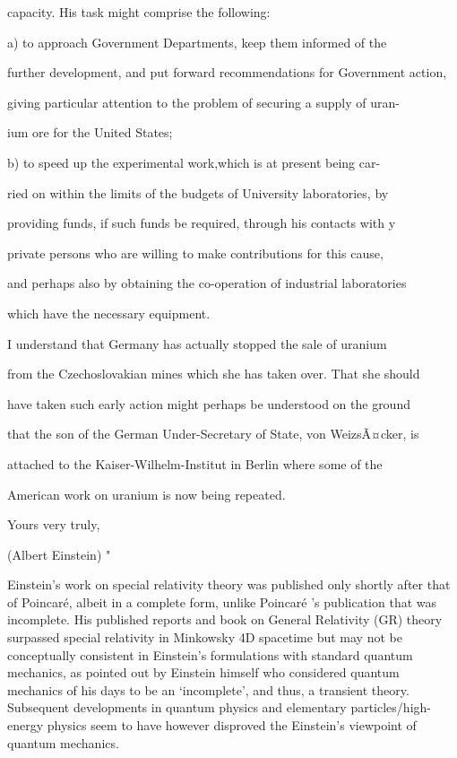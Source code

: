 \documentclass[12pt]{article}
\begin{document}
capacity. His task might comprise the following:

      a) to approach Government Departments, keep them informed of the

further development, and put forward recommendations for Government action,

giving particular attention to the problem of securing a supply of uran-

ium ore for the United States;

      b) to speed up the experimental work,which is at present being car-

ried on within the limits of the budgets of University laboratories, by

providing funds, if such funds be required, through his contacts with y

private persons who are willing to make contributions for this cause,

and perhaps also by obtaining the co-operation of industrial laboratories

which have the necessary equipment.

      I understand that Germany has actually stopped the sale of uranium

from the Czechoslovakian mines which she has taken over. That she should

have taken such early action might perhaps be understood on the ground

that the son of the German Under-Secretary of State, von WeizsÃ¤cker, is

attached to the Kaiser-Wilhelm-Institut in Berlin where some of the

American work on uranium is now being repeated.

                                            Yours very truly,
                                             
                                            (Albert Einstein) "
 

Einstein's work on special relativity theory was published only shortly after that of Poincar\'e, albeit in a complete form, unlike Poincar\'e 's publication that was incomplete. His published reports and book on General Relativity (GR) theory surpassed special relativity in Minkowsky 4D spacetime but may not be conceptually consistent in Einstein's formulations with standard quantum mechanics, as pointed out by Einstein himself who considered quantum mechanics of his days to be an `incomplete', and thus, a transient theory. Subsequent developments in quantum physics and elementary particles/high-energy physics seem to have however disproved the Einstein's viewpoint of quantum mechanics. 
\end{document}
